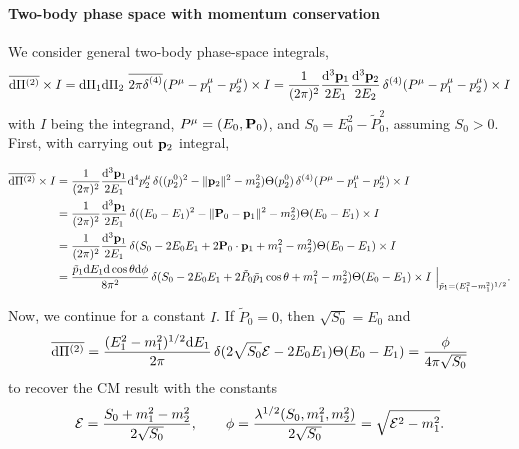 \documentclass[CheatSheet]{subfiles}
\begin{document}
\paragraph{Two-body phase space with momentum conservation}
We consider general two-body phase-space integrals,
\begin{equation}
 \overline{\dd\Pi^{(2)}}\times I
   = \dd\Pi_1\dd\Pi_2\,\diracdeltabar[4](P^\mu-p_1^\mu-p_2^\mu)\times I
   =\frac{1}{(2\pi)^2}\frac{\dd^3{\vc p_1}}{2E_1}\frac{\dd^3{\vc p_2}}{2E_2}\diracdelta[4](P^\mu-p_1^\mu-p_2^\mu)\times I
\end{equation}
with $I$ being the integrand, $P^\mu=(E_0, {\mathbf{P}}_0)$, and $S_0=E_0^2-\tilde P_0^2$, assuming $S_0>0$. First, with carrying out ${\mathbf{p}}_2$ integral,

\begin{align}
 \overline{\dd\Pi^{(2)}}\times I
  &= \frac{1}{(2\pi)^2}\frac{\dd^3{\vc p_1}}{2E_1}{\dd^4 p_2^\mu}
  \diracdelta((p_2^0)^2-\|\vc p_2\|^2-m_2^2)\Theta(p_2^0)
  \diracdelta[4](P^\mu-p_1^\mu-p_2^\mu)\times I
  \\&=
   \frac{1}{(2\pi)^2}\frac{\dd^3{\vc p_1}}{2E_1}
  \diracdelta((E_0-E_1)^2-\|\vc P_0-\vc p_1\|^2-m_2^2)\Theta(E_0-E_1)\times I
  \\&=
   \frac{1}{(2\pi)^2}\frac{\dd^3{\vc p_1}}{2E_1}
  \diracdelta(S_0-2E_0E_1+2\vc P_0\cdot\vc p_1+m_1^2-m_2^2)\Theta(E_0-E_1)\times I
  \\&=
   \frac{\tilde p_1\dd E_1\dd\cos\theta\dd\phi}{8\pi^2}
  \diracdelta(S_0-2E_0E_1+2\tilde P_0\tilde p_1\cos\theta+m_1^2-m_2^2)\Theta(E_0-E_1)\times I~\Big|_{\tilde p_1=(E_1^2-m_1^2)^{1/2}}.
\end{align}


Now, we continue for a constant $I$.  If $\tilde P_0=0$, then $\sqrt {S_0}=E_0$ and
\begin{equation}
 \overline{\dd\Pi^{(2)}}
  =
   \frac{(E_1^2-m_1^2)^{1/2}\dd E_1}{2\pi}
  \diracdelta(2\sqrt{S_0}\mathcal E-2E_0E_1)\Theta(E_0-E_1)
  =
   \frac{\phi}{4\pi\sqrt{S_0}}
\end{equation}
to recover the CM result with the constants
\begin{equation}
  \mathcal E=\frac{S_0+m_1^2-m_2^2}{2\sqrt{S_0}},\qquad
  \phi=\frac{\Kallen[1/2](S_0,m_1^2,m_2^2)}{2\sqrt{S_0}}=\sqrt{\mathcal E^2-m_1^2}.
\end{equation}
\end{document}
